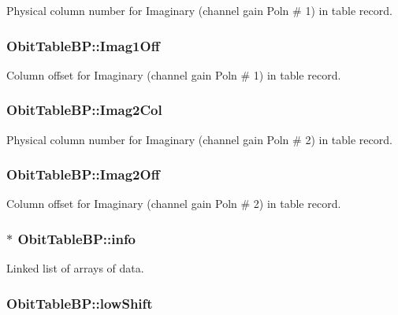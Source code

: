 Physical column number for Imaginary (channel gain Poln \# 1) in table record. 

\subsubsection{ {\bf Obit\-Table\-BP::Imag1Off}}\label{structObitTableBP_o46}


Column offset for Imaginary (channel gain Poln \# 1) in table record. 

\subsubsection{ {\bf Obit\-Table\-BP::Imag2Col}}\label{structObitTableBP_o55}


Physical column number for Imaginary (channel gain Poln \# 2) in table record. 

\subsubsection{ {\bf Obit\-Table\-BP::Imag2Off}}\label{structObitTableBP_o54}


Column offset for Imaginary (channel gain Poln \# 2) in table record. 

\subsubsection{$\ast$ {\bf Obit\-Table\-BP::info}}\label{structObitTableBP_o5}


Linked list of arrays of data. 

\subsubsection{ {\bf Obit\-Table\-BP::low\-Shift}}\label{structObitTableBP_o21}


